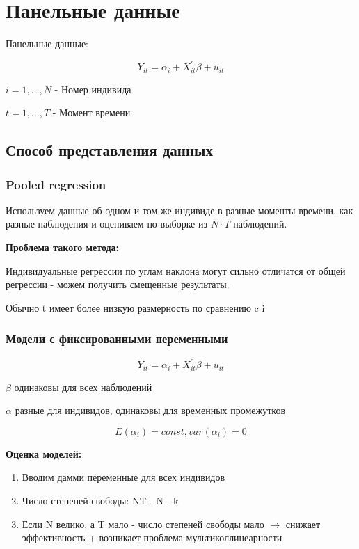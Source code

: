 \documentclass[a4paper, 12pt]{article}
\begin{document}
\section{Панельные данные}

Панельные данные:

\[Y_{it} = \alpha_i + X_{it}^{\prime} \beta + u_{it}\]

$i = 1, \ldots, N$ - Номер индивида

$t = 1, \ldots, T$ - Момент времени

\subsection{Способ представления данных}
\subsubsection{Pooled regression}

Используем данные об одном и том же индивиде в разные моменты времени,
как разные наблюдения и оцениваем по выборке из $N \cdot T$ наблюдений.

\textbf{Проблема такого метода:}

Индивидуальные регрессии по углам наклона могут сильно отличатся от общей регрессии
- можем получить смещенные результаты.

Обычно t имеет более низкую размерность по сравнению c i 

\subsubsection{Модели с фиксированными переменными}

\[Y_{it} = \alpha_i + X_{it}^{\prime}\beta + u_{it}\]

$\beta$ одинаковы для всех наблюдений

$\alpha$ разные для индивидов, одинаковы для временных промежутков

\[E(\alpha_i) = const, var(\alpha_i) = 0\]

\textbf{Оценка моделей:}

\begin{enumerate}
    \item Вводим дамми переменные для всех индивидов
    \item Число степеней свободы: NT - N - k
    \item Если N велико, а T мало - число степеней свободы мало 
    $\rightarrow$ снижает эффективность + возникает проблема мультиколлинеарности
\end{enumerate}
\end{document}
